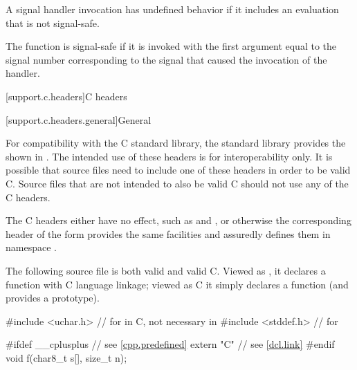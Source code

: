 A signal handler invocation has undefined behavior if it includes
an evaluation that is not signal-safe.

\pnum
{}%
The function  is signal-safe if it is invoked
with the first argument equal to the signal number
corresponding to the signal that caused the invocation of the handler.


[support.c.headers]{C headers}

[support.c.headers.general]{General}

\pnum
For compatibility with the
%
C standard library, the \Cpp{} standard library provides
the  shown in .
The intended use of these headers is for interoperability only.
It is possible that \Cpp{} source files need to include
one of these headers in order to be valid C.
Source files that are not intended to also be valid C
should not use any of the C headers.

\begin{note}
The C headers either have no effect,
such as  and , or
otherwise the corresponding header of the form 
provides the same facilities and
assuredly defines them in namespace .
\end{note}
\begin{example}
The following source file is both valid \Cpp{} and valid C.
Viewed as \Cpp{}, it declares a function with C language linkage;
viewed as C it simply declares a function (and provides a prototype).
\begin{codeblock}
#include <uchar.h>      // for  in C, not necessary in \Cpp{}
#include <stddef.h>     // for 

#ifdef __cplusplus      // see \ref{cpp.predefined}
extern "C"              // see \ref{dcl.link}
#endif
void f(char8_t s[], size_t n);
\end{codeblock}
\end{example}

